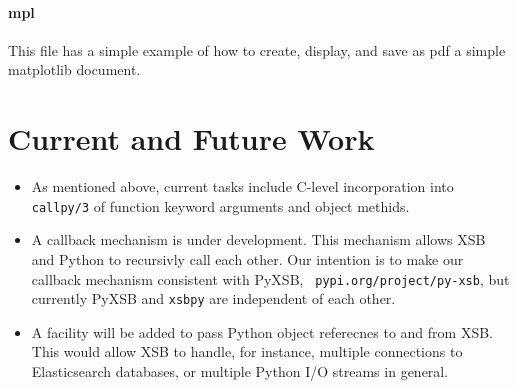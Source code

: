 \paragraph{mpl}
This file has a simple example of how to create, display, and save as
pdf a simple matplotlib document.

\section{Current and Future Work}

\begin{itemize}
\item As mentioned above, current tasks include C-level incorporation
  into {\tt callpy/3} of function keyword arguments and object
  methids.

\item A callback mechanism is under development.  This mechanism
  allows XSB and Python to recursivly call each other.  Our intention
  is to make our callback mechanism consistent with PyXSB, {\tt
    pypi.org/project/py-xsb}, but currently PyXSB and {\tt xsbpy} are
  independent of each other.

\item A facility will be added to pass Python object referecnes to and
  from XSB.  This would allow XSB to handle, for instance, multiple
  connections to Elasticsearch databases, or multiple Python I/O
  streams in general.

\end{itemize}  
